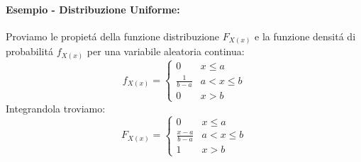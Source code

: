             \paragraph{Esempio - Distribuzione Uniforme:} 
                Proviamo le propietá della funzione distribuzione $F_{X(x)}$ e la funzione densitá di probabilitá $f_{X(x)}$ per una variabile aleatoria
                continua:
                \[
                    f_{X(x)} = 
                    \begin{cases}
                        0 & x\leq a\nonumber \\
                        \frac{1}{b-a} & a<x\leq b\nonumber \\
                        0 & x>b\nonumber
                    \end{cases}  
                \]
                Integrandola troviamo:
                \[
                    F_{X(x)} = 
                    \begin{cases}
                        0 & x\leq a\nonumber \\
                        \frac{x-a}{b-a} & a<x\leq b\nonumber \\
                        1 & x>b\nonumber
                    \end{cases}  
                \]
